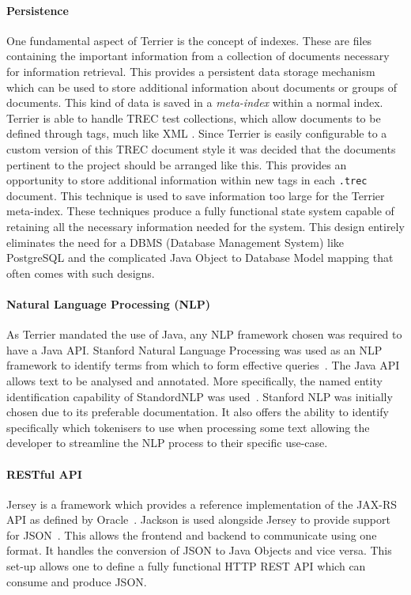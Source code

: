 \documentclass{l4proj}
\newcommand{\code}[1]{\texttt{#1}}
\begin{document}
\paragraph{Persistence}
One fundamental aspect of Terrier is the concept of indexes. These are files containing the important information from a collection of documents necessary for information retrieval. This provides a persistent data storage mechanism which can be used to store additional information about documents or groups of documents. This kind of data is saved in a \textit{meta-index} within a normal index.
Terrier is able to handle TREC test collections, which allow documents to be defined through tags, much like XML \cite{trecnist}.
Since Terrier is easily configurable to a custom version of this TREC document style it was decided that the documents pertinent to the project should be arranged like this.
This provides an opportunity to store additional information within new tags in each \code{.trec} document. This technique is used to save information too large for the Terrier meta-index.
These techniques produce a fully functional state system capable of retaining all the necessary information needed for the system.
This design entirely eliminates the need for a DBMS (Database Management System) like PostgreSQL and the complicated Java Object to Database Model mapping that often comes with such designs.

\paragraph{Natural Language Processing (NLP)}
As Terrier mandated the use of Java, any NLP framework chosen was required to have a Java API.
Stanford Natural Language Processing was used as an NLP framework to identify terms from which to form effective queries~\cite{manning-EtAl:2014:P14-5}. The Java API allows text to be analysed and annotated. More specifically, the named entity identification capability of StandordNLP was used~\cite{finkel2005incorporating}.
Stanford NLP was initially chosen due to its preferable documentation. It also offers the ability to identify specifically which tokenisers to use when processing some text allowing the developer to streamline the NLP process to their specific use-case.

\paragraph{RESTful API}
Jersey is a framework which provides a reference implementation of the JAX-RS API as defined by Oracle~\cite{jersey,jaxrsapi}.
Jackson is used alongside Jersey to provide support for JSON~\cite{jackson}. This allows the frontend and backend to communicate using one format. It handles the conversion of JSON to Java Objects and vice versa.
This set-up allows one to define a fully functional HTTP REST API which can consume and produce JSON.
\end{document}

